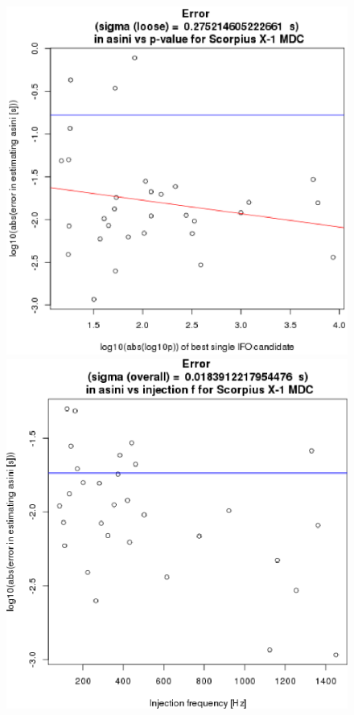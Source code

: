 \begin{figure}
\begin{center}
\includegraphics[trim=0 10 10 15, clip, width=0.52\paperwidth,height=0.36\paperheight]{ErrorAsini.eps}
\includegraphics[trim=0 0 0 10, clip, width=0.52\paperwidth,height=0.36\paperheight]{plots/ErrorAsinivsF-overall.eps}

\end{center}
\end{figure}
